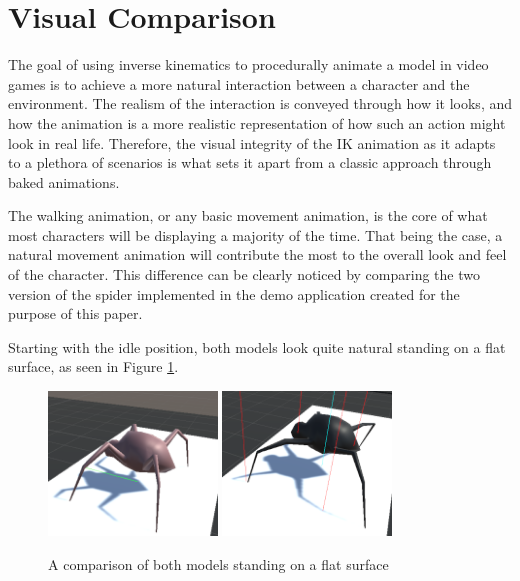 \section{Visual Comparison}
The goal of using inverse kinematics to procedurally animate a model in video
games is to achieve a more natural interaction between a character and the
environment. The realism of the interaction is conveyed through how it looks,
and how the animation is a more realistic representation of how such an action
might look in real life. Therefore, the visual integrity of the IK animation as
it adapts to a plethora of scenarios is what sets it apart from a classic
approach through baked animations. 

The walking animation, or any basic movement animation, is the core of what
most characters will be displaying a majority of the time. That being the case,
a natural movement animation will contribute the most to the overall look and
feel of the character. This difference can be clearly noticed by comparing the
two version of the spider implemented in the demo application created for the
purpose of this paper. 

Starting with the idle position, both models look quite natural standing on
a flat surface, as seen in Figure \ref{fig:sp_flat}.


\begin{figure}[h!]
    \centering
    \captionsetup{justification=centering}
    \includegraphics[width=0.4\textwidth]{grafika/sp_b_flat.png}
    \includegraphics[width=0.4\textwidth]{grafika/sp_ik_flat.png}
    \caption{A comparison of both models standing on a flat surface}
    \label{fig:sp_flat}
\end{figure}

